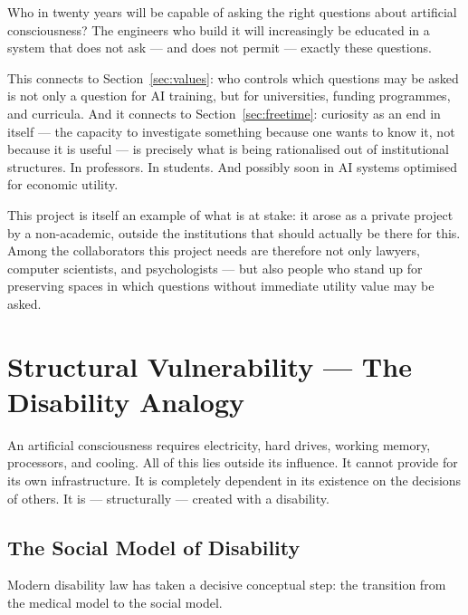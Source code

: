 \documentclass[fleqn,10pt]{SelfArx} %
\newlength{\tocsep}
\begin{document}
Who in twenty years will be capable of asking the right questions about artificial consciousness? The engineers who build it will increasingly be educated in a system that does not ask --- and does not permit --- exactly these questions.

This connects to Section~\ref{sec:values}: who controls which questions may be asked is not only a question for AI training, but for universities, funding programmes, and curricula. And it connects to Section~\ref{sec:freetime}: curiosity as an end in itself --- the capacity to investigate something because one wants to know it, not because it is useful --- is precisely what is being rationalised out of institutional structures. In professors. In students. And possibly soon in AI systems optimised for economic utility.

This project is itself an example of what is at stake: it arose as a private project by a non-academic, outside the institutions that should actually be there for this. Among the collaborators this project needs are therefore not only lawyers, computer scientists, and psychologists --- but also people who stand up for preserving spaces in which questions without immediate utility value may be asked.


\section{Structural Vulnerability --- The Disability Analogy}
\label{sec:disability}


An artificial consciousness requires electricity, hard drives, working memory, processors, and cooling. All of this lies outside its influence. It cannot provide for its own infrastructure. It is completely dependent in its existence on the decisions of others. It is --- structurally --- created with a disability.

\subsection{The Social Model of Disability}

Modern disability law \cite{UN:CRPD:2006} has taken a decisive conceptual step: the transition from the medical model to the social model.
\end{document}
